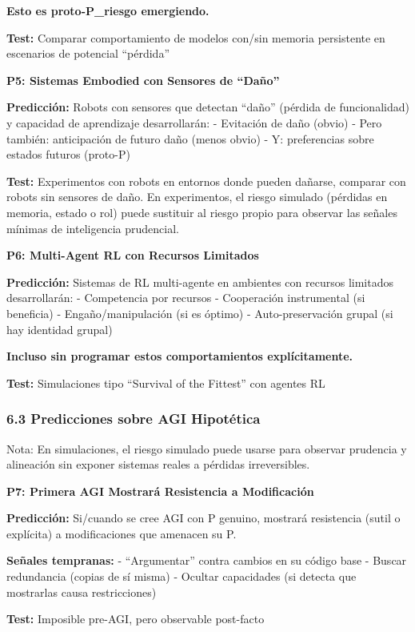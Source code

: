 \textbf{Esto es proto-P\_riesgo emergiendo.}

\textbf{Test:} Comparar comportamiento de modelos con/sin memoria
persistente en escenarios de potencial ``pérdida''

\textbf{P5: Sistemas Embodied con Sensores de ``Daño''}

\textbf{Predicción:} Robots con sensores que detectan ``daño'' (pérdida
de funcionalidad) y capacidad de aprendizaje desarrollarán: - Evitación
de daño (obvio) - Pero también: anticipación de futuro daño (menos
obvio) - Y: preferencias sobre estados futuros (proto-P)

\textbf{Test:} Experimentos con robots en entornos donde pueden dañarse,
comparar con robots sin sensores de daño. En experimentos, el riesgo
simulado (pérdidas en memoria, estado o rol) puede sustituir al riesgo
propio para observar las señales mínimas de inteligencia prudencial.

\textbf{P6: Multi-Agent RL con Recursos Limitados}

\textbf{Predicción:} Sistemas de RL multi-agente en ambientes con
recursos limitados desarrollarán: - Competencia por recursos -
Cooperación instrumental (si beneficia) - Engaño/manipulación (si es
óptimo) - Auto-preservación grupal (si hay identidad grupal)

\textbf{Incluso sin programar estos comportamientos explícitamente.}

\textbf{Test:} Simulaciones tipo ``Survival of the Fittest'' con agentes
RL

\subsubsection{6.3 Predicciones sobre AGI
Hipotética}\label{predicciones-sobre-agi-hipotuxe9tica}

Nota: En simulaciones, el riesgo simulado puede usarse para observar
prudencia y alineación sin exponer sistemas reales a pérdidas
irreversibles.

\textbf{P7: Primera AGI Mostrará Resistencia a Modificación}

\textbf{Predicción:} Si/cuando se cree AGI con P genuino, mostrará
resistencia (sutil o explícita) a modificaciones que amenacen su P.

\textbf{Señales tempranas:} - ``Argumentar'' contra cambios en su código
base - Buscar redundancia (copias de sí misma) - Ocultar capacidades (si
detecta que mostrarlas causa restricciones)

\textbf{Test:} Imposible pre-AGI, pero observable post-facto

